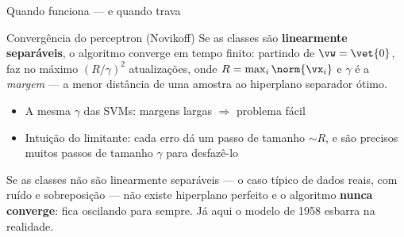 \documentclass[aspectratio=169, 11pt]{beamer}
\begin{document}
\begin{frame}{Quando funciona — e quando trava}
  \begin{teobox}{Convergência do perceptron (Novikoff)}
    Se as classes são \textbf{linearmente separáveis}, o algoritmo converge em
    tempo finito: partindo de $\vw = \vet{0}$, faz no máximo
    $\left(R/\gamma\right)^{2}$ atualizações, onde
    $R = \max_i \norm{\vx_i}$ e $\gamma$ é a \emph{margem} — a menor distância
    de uma amostra ao hiperplano separador ótimo.
  \end{teobox}

  \begin{itemize}\setlength{\itemsep}{0.3ex}
    \item A mesma $\gamma$ das SVMs: margens largas $\Rightarrow$ problema fácil
    \item Intuição do limitante: cada erro dá um passo de tamanho
          $\sim\!R$, e são precisos muitos passos de tamanho $\gamma$
          para desfazê-lo
  \end{itemize}

  \begin{alertabox}
    Se as classes \alert{não} são linearmente separáveis — o caso típico de
    dados reais, com ruído e sobreposição — não existe hiperplano perfeito e o
    algoritmo \textbf{nunca converge}: fica oscilando para sempre. Já aqui o
    modelo de 1958 esbarra na realidade.
  \end{alertabox}
\end{frame}
\end{document}
